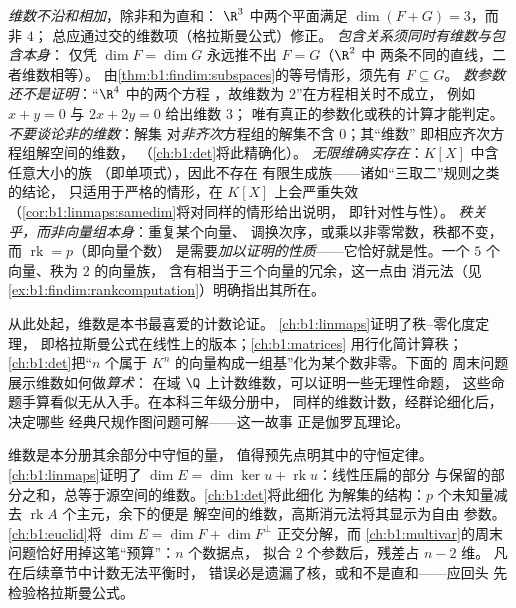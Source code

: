 \begin{remark}[常见误区]
\label{rem:b1:findim:pitfalls}
\emph{维数不沿和相加}，除非和为直和：
$\R^3$ 中两个平面满足 $\dim(F + G) = 3$，而非 $4$；
总应通过交的维数项（格拉斯曼公式）修正。
\emph{包含关系须同时有维数\emph{与}包含本身}：
仅凭 $\dim F = \dim G$ 永远推不出 $F = G$（$\R^2$ 中
两条不同的直线，二者维数相等）。
由\cref{thm:b1:findim:subspaces}的等号情形，须先有 $F \subseteq G$。
\emph{数参数还不是证明}：“$\R^4$ 中的两个方程
，故维数为 $2$”在方程相关时不成立，
例如 $x + y = 0$ 与 $2x + 2y = 0$ 给出维数 $3$；
唯有真正的参数化或秩的计算才能判定。
\emph{不要谈论非的维数}：解集
对\emph{非齐次}方程组的解集不含 $0$；其“维数”
即相应齐次方程组解空间的维数，
（\cref{ch:b1:det}将此精确化）。
\emph{无限维确实存在}：$K[X]$ 中含任意大小的族
（即单项式），因此不存在
有限生成族——诸如“三取二”规则之类的结论，
只适用于严格的情形，在 $K[X]$ 上会严重失效
（\cref{cor:b1:linmaps:samedim}将对同样的情形给出说明，
即针对性与性）。
\emph{秩关乎，而非向量组本身}：重复某个向量、
调换次序，或乘以非零常数，秩都不变，
而 $\operatorname{rk} = p$（即向量个数）
是需要\emph{加以证明的性质}——它恰好就是性。一个
$5$ 个向量、秩为 $2$ 的向量族，
含有相当于三个向量的冗余，这一点由
消元法（见\cref{ex:b1:findim:rankcomputation}）明确指出其所在。
\end{remark}

\begin{remark}[维数的用武之地]
\label{rem:b1:findim:whereused}
从此处起，维数是本书最喜爱的计数论证。
\cref{ch:b1:linmaps}证明了秩--零化度定理，
即格拉斯曼公式在线性上的版本；\cref{ch:b1:matrices}
用行化简计算秩；\cref{ch:b1:det}把“$n$
个属于 $K^n$ 的向量构成一组基”化为某个数非零。下面的
周末问题展示维数如何做\emph{算术}：
在域 $\Q$ 上计数维数，可以证明一些无理性命题，
这些命题手算看似无从入手。在本科三年级分册中，
同样的维数计数，经群论细化后，决定哪些
经典尺规作图问题可解——这一故事
正是伽罗瓦理论。
\end{remark}

\begin{remark}[第 3 册内的展望]
\label{rem:b1:findim:perspectives}
维数是本分册其余部分中守恒的量，
值得预先点明其中的守恒定律。
\cref{ch:b1:linmaps}证明了 $\dim E = \dim\ker u +
\operatorname{rk} u$：线性压扁的部分
与保留的部分之和，总等于源空间的维数。\cref{ch:b1:det}将此细化
为解集的结构：$p$ 个未知量减去
$\operatorname{rk} A$ 个主元，余下的便是
解空间的维数，高斯消元法将其显示为自由
参数。\cref{ch:b1:euclid}将 $\dim E = \dim F + \dim
F^\perp$ 正交分解，而
\cref{ch:b1:multivar}的周末问题恰好用掉这笔“预算”：$n$ 个数据点，
拟合 $2$ 个参数后，残差占 $n - 2$ 维。
凡在后续章节中计数无法平衡时，
错误必是遗漏了核，或和不是直和——应回头
先检验格拉斯曼公式。
\end{remark}

